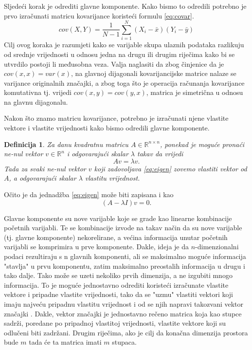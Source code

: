 \documentclass[times, utf8, diplomski]{fer}
\newtheorem{definition}{Definicija}         %
\begin{document}
Sljedeći korak je odrediti glavne komponente. Kako bismo to odredili potrebno je prvo izračunati matricu kovarijance koristeći formulu \ref{eq:covar}.
\begin{equation}
    cov(X, Y) = \frac{1}{N - 1}\sum_{i=1}^{N} (X_i - \bar{x})(Y_i - \bar{y})
    \label{eq:covar}
\end{equation}
Cilj ovog koraka je razumjeti kako se varijable skupa ulaznih podataka razlikuju od srednje vrijednosti u odnosu jedna na drugu ili drugim riječima kako bi se utvrdilo postoji li međusobna veza. Valja naglasiti da zbog činjenice da je $cov(x, x) = var(x)$, na glavnoj dijagonali kovarijancijske matrice nalaze se varijance originalnih značajki, a zbog toga što je operacija računanja kovarijance komutativna tj. vrijedi $cov(x,y) = cov(y, x)$, matrica je simetrična u odnosu na glavnu dijagonalu.

Nakon što znamo matricu kovarijance, potrebno je izračunati njene vlastite vektore  i vlastite vrijednosti  kako bismo odredili glavne komponente.

\begin{definition}
    Za danu kvadratnu matricu $A \in \mathbb{R}^{n \times n}$, ponekad je moguće pronaći ne-nul vektor $v \in \mathbb{R}^n$ i odgovarajući skalar $\lambda$ takav da vrijedi
    \begin{equation}
        Av = \lambda v.
        \label{eq:eigen}
    \end{equation}
    Tada za svaki ne-nul vektor $v$ koji zadovoljava \ref{eq:eigen} zovemo vlastiti vektor od $A$, a odgovarajući skalar $\lambda$ vlastitu vrijednost.
\end{definition}
Očito je da jednadžba \ref{eq:eigen} može biti zapisana i kao
\begin{equation}
    (A - \lambda I)v = 0.
\end{equation}

Glavne komponente su nove varijable koje se grade kao linearne kombinacije početnih varijabli. Te se kombinacije izvode na takav način da su nove varijable (tj. glavne komponente) nekorelirane, a većina informacija unutar početnih varijabli se komprimira u prve komponente. Dakle, ideja je da $n$-dimenzionalni podaci rezultiraju s n glavnih komponenti, ali se maksimalno moguće informacija "stavlja" u prvu komponentu, zatim maksimalno preostalih informacija u drugu i tako dalje. Tako može se uzeti nekoliko prvih dimenzija, a ne izgubiti mnogo informacija. To je moguće jednostavno odrediti koristeći izračunate vlastite vektore i pripadne vlastite vrijednosti, tako da se "uzmu" vlastiti vektori koji imaju najveću pripadnu vlastitu vrijednost i od se njih napravi takozvani vektor značajki . Dakle, vektor značajki je jednostavno rečeno matrica koja kao stupce sadrži, poredane po pripadnoj vlastitoj vrijednosti, vlastite vektore koji su odlučeni biti zadržani. Drugim riječima, ako je cilj da konačna dimenzija prostora bude $m$ tada će ta matrica imati $m$ stupaca.
\end{document}
